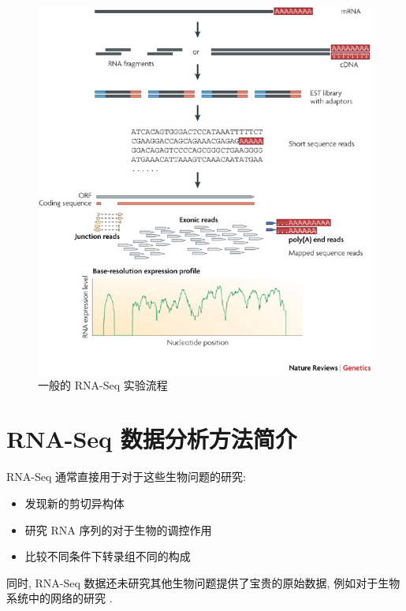 \begin{figure}[!t]
\centering
\includegraphics[width=\textwidth]{figures/rna-seq-experiment.jpg}
\caption{一般的 RNA-Seq 实验流程 \cite{wang2009rna}}
\label{intro-rna-seq-ex}
\end{figure}

\section{RNA-Seq 数据分析方法简介}
RNA-Seq 通常直接用于对于这些生物问题的研究:
\begin{itemize}
\item 发现新的剪切异构体 \cite{merkin2012evolutionary, wang2010novo, roberts2011identification, wang2010mapsplice}

\item 研究 RNA 序列的对于生物的调控作用 \cite{van2011xuts}

\item 比较不同条件下转录组不同的构成 \cite{trapnell2012differential}
\end{itemize}
同时, RNA-Seq 数据还未研究其他生物问题提供了宝贵的原始数据, 
例如对于生物系统中的网络的研究 \cite{sinicropi2012whole}. 

